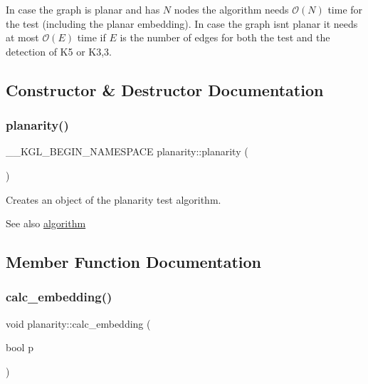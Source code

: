 In case the graph is planar and has $N$ nodes the algorithm needs $\mathcal{O}(N)$ time for the test (including the planar embedding). In case the graph isn\textquotesingle{}t planar it needs at most $\mathcal{O}(E)$ time if $E$ is the number of edges for both the test and the detection of K5 or K3,3. 

\subsection{Constructor \& Destructor Documentation}
\mbox{\label{classplanarity_ab0377cf75279277a848f7e2eed507d00}} 
\subsubsection{\texorpdfstring{planarity()}{planarity()}}
{\footnotesize\ttfamily \+\_\+\+\_\+\+K\+G\+L\+\_\+\+B\+E\+G\+I\+N\+\_\+\+N\+A\+M\+E\+S\+P\+A\+CE planarity\+::planarity (\begin{DoxyParamCaption}{ }\end{DoxyParamCaption})}



Creates an object of the planarity test algorithm. 

\begin{DoxySeeAlso}{See also}
\mbox{\hyperlink{classalgorithm}{algorithm}} 
\end{DoxySeeAlso}


\subsection{Member Function Documentation}
\mbox{\label{classplanarity_a1679e285a7135b48b572764f5e8e773d}} 
\subsubsection{\texorpdfstring{calc\+\_\+embedding()}{calc\_embedding()}\hspace{0.1cm}{\footnotesize\ttfamily [1/2]}}
{\footnotesize\ttfamily void planarity\+::calc\+\_\+embedding (\begin{DoxyParamCaption}\item[{bool}]{p }\end{DoxyParamCaption})\hspace{0.3cm}{\ttfamily [inline]}}



